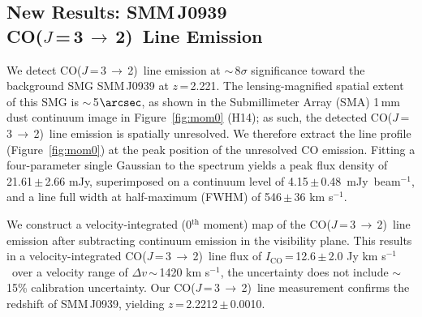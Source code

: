 \documentclass[iop]{emulateapj}
\newcommand{\CO}{\mbox{CO($J$\,=\,3\,$\rightarrow$\,2) }}
\newcommand{\pmOne}{\mbox{$^{-1}$}}
\begin{document}
\subsection{New Results: SMM\,J0939\\ \CO Line Emission}
We detect \CO line emission at $\sim$\,8$\sigma$ significance toward the background SMG SMM\,J0939 at $z$\,=\,2.221.
The lensing-magnified spatial extent of this SMG is $\sim$\,5$\arcsec$, as shown in the Submillimeter Array (SMA) 1\,mm dust continuum image in Figure~\ref{fig:mom0} (H14); as such,
the detected \CO line emission is spatially unresolved. We therefore extract the line profile (Figure~\ref{fig:mom0}) at the peak position of the unresolved
CO emission. Fitting a four-parameter single Gaussian to the spectrum yields a peak flux density of 21.61\,$\pm$\,2.66\,\,mJy, superimposed on a
continuum level of 4.15\,$\pm$\,0.48~mJy~beam\pmOne, and a line full width at half-maximum (FWHM) of 546\,$\pm$\,36\,\,km\,\,s\pmOne.  \par
We construct a velocity-integrated (0$^\textrm{th}$ moment) map of the \CO line
emission after subtracting continuum emission in the visibility plane. This results in a velocity-integrated \CO line flux of $I_\textrm{CO}$\,=\,12.6\,$\pm$\,2.0 Jy km\,\,s\pmOne\ over a velocity range of $\Delta v$\,$\sim$\,1420 km\,\,s\pmOne, the uncertainty does not include $\sim$\,15\% calibration
uncertainty. Our \CO line measurement confirms the redshift of SMM\,J0939, yielding $z$\,=\,2.2212\,$\pm$\,0.0010.
\end{document}
